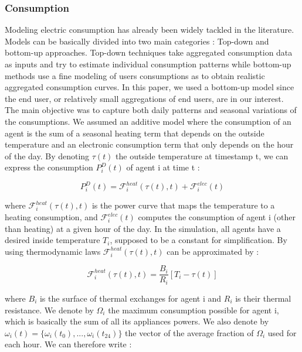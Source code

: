 \documentclass[journal]{IEEEtran}
\begin{document}
\subsubsection{Consumption}
Modeling electric consumption has already been widely tackled in the literature. Models can be basically divided into two main categories : Top-down and bottom-up approaches. Top-down techniques take aggregated consumption data as inputs and try to estimate individual consumption patterns while bottom-up methods use a fine modeling of users consumptions as to obtain realistic aggregated consumption curves. In this paper, we used a bottom-up model since the end user, or relatively small aggregations of end users, are in our interest. The main objective was to capture both daily patterns and seasonal variations of the consumptions. We assumed an additive model where the consumption of an agent is the sum of a seasonal heating term that depends on the outside temperature and an electronic consumption term that only depends on the hour of the day. By denoting $ \tau(t) $ the outside temperature at timestamp t, we can express the consumption $ P_{i}^{D}(t) $ of agent i at time t :


\begin{equation}
P_{i}^{D}(t) = \mathcal{F}_{i}^{heat}(\tau(t), t) + \mathcal{F}_{i}^{elec}(t)
\end{equation}


\noindent where $ \mathcal{F}_{i}^{heat}(\tau(t), t) $ is the power curve that maps the temperature to a heating consumption, and $ \mathcal{F}_{i}^{elec}(t) $ computes the consumption of agent i (other than heating) at a given hour of the day. In the simulation, all agents have a desired inside temperature $ T_{i} $, supposed to be a constant for simplification. By using thermodynamic laws $ \mathcal{F}_{i}^{heat}(\tau(t), t) $ can be approximated by :


\begin{equation}
\mathcal{F}_{i}^{heat}(\tau(t), t) = \dfrac{B_{i}}{R_{i}} \left[ T_{i} - \tau(t) \right]
\end{equation}


\noindent where $ B_{i} $ is the surface of thermal exchanges for agent i and $ R_{i} $ is their thermal resistance. We denote by $ \Omega_{i} $ the maximum consumption possible for agent i, which is basically the sum of all its appliances powers. We also denote by $ \omega_{i}(t) = \{ \omega_{i}(t_{0}),...,\omega_{i}(t_{24}) \} $ the vector of the average fraction of $ \Omega_{i} $ used for each hour. We can therefore write :
\end{document}
